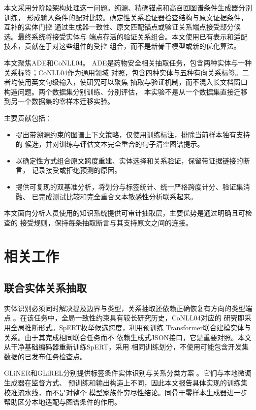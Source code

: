 \documentclass[12pt,a4paper,fontset=none]{ctexart}
\begin{document}
本文采用分阶段架构处理这一问题。纯源、精确锚点和高召回图谱条件生成器分别训练，
形成输入条件的配对比较。确定性关系验证器检查结构与原文证据条件，互补的实体门控
通过生成器一致性、原文匹配锚点或验证关系端点接受部分候选。最终系统将接受实体与
端点存活的验证关系组合。本文使用已有表示和适配技术，贡献在于对这些组件的受控
组合，而不是新骨干模型或新的优化算法。

本文聚焦ADE\cite{gurulingappa2012ade}和CoNLL04\cite{roth2004conll}。
ADE是药物安全相关抽取任务，包含两种实体与一种关系标签；CoNLL04作为通用领域
对照，包含四种实体与五种有向关系标签。二者均使用英文句级输入，使研究可以聚焦
抽取与验证机制，而不混入长文档窗口构造问题。两个数据集分别训练、分别评估，
本实验不是从一个数据集直接迁移到另一个数据集的零样本迁移实验。

主要贡献包括：
\begin{itemize}
\item 提出带溯源约束的图谱上下文策略，仅使用训练标注，排除当前样本独有支持的
候选，并对训练与评估文本完全重合的句子清空图谱提示。
\item 以确定性方式组合原文跨度重建、实体选择和关系验证，保留带证据链接的断言，
记录接受或拒绝预测的原因。
\item 提供可复现的双基准分析，将划分与标签统计、统一严格跨度计分、验证集消融、
已完成测试比较和完全重合文本敏感性分析联系起来。
\end{itemize}
本文面向分析人员使用的知识系统提供可审计抽取层，主要优势是通过明确且可检查的
接受规则，保持每条抽取断言与其支持原文之间的连接。

\section{相关工作}
\label{sec:related}
\subsection{联合实体关系抽取}
实体识别必须同时解决提及边界与类型，关系抽取还依赖正确恢复有方向的类型端点
\cite{li2022ner}。在该任务中，全局一致性约束具有较长研究历史，CoNLL04对应的
研究即采用全局推断形式\cite{roth2004conll}。SpERT枚举候选跨度，利用预训练
Transformer联合建模实体与关系\cite{eberts2020spert}。由于其完成相同联合任务而不
依赖生成式JSON接口，它是重要对照。本文从干净基础编码器重新训练SpERT，采用
相同训练划分，不使用可能包含开发集数据的已发布任务检查点。

GLiNER和GLiREL分别提供标签条件实体识别与关系分类方案
\cite{zaratiana2024gliner,boylan2025glirel}。它们与本地微调生成器在监督方式、
预训练和输出构造上不同，因此本文报告具体实现的训练集校准流水线，而不是对整个
模型家族作穷尽性结论。同骨干零样本生成器进一步帮助区分本地适配与图谱条件的作用。
\end{document}
